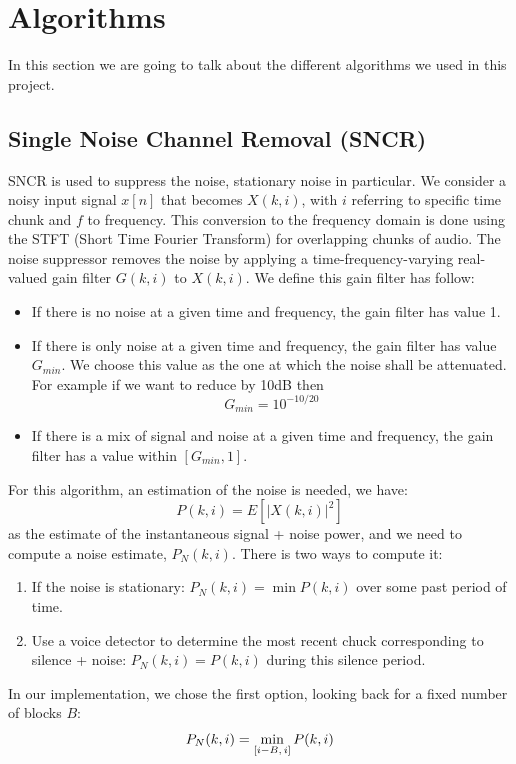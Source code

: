 \documentclass[11pt,a4paper,titlepage]{report}
\providecommand{\tightlist}{%
	\setlength{\itemsep}{0pt}\setlength{\parskip}{0pt}}
\begin{document}
\section{Algorithms}
\hspace*{0.6cm}
In this section we are going to talk about the different algorithms we used in this project.
\subsection{Single Noise Channel Removal (SNCR)}
\label{sec:SNCR}
\hspace*{0.6cm}
SNCR is used to suppress the noise, stationary noise in particular\cite{SNCR}. We consider a noisy input signal $ x[n] $ that becomes $ X(k,i) $, with $ i $ referring to specific time chunk and $ f $ to frequency. This conversion to the frequency domain is done using the STFT (Short Time Fourier Transform) for overlapping chunks of audio. The noise suppressor removes the noise by applying a time-frequency-varying real-valued gain filter $ G(k,i) $ to $ X(k,i) $. We define this gain filter has follow:
\begin{itemize}
	\tightlist
	\item If there is no noise at a given time and frequency, the gain filter has value 1.
	\item If there is only noise at a given time and frequency, the gain filter has value $ G_{min} $. We choose this value as the one at which the noise shall be attenuated. For example if we want to reduce by 10dB then \begin{equation} G_{min} = 10^{-10/20}
	\end{equation}
	\item If there is a mix of signal and noise at a given time and frequency, the gain filter has a value within $ [G_{min}, 1] $.
\end{itemize}
For this algorithm, an estimation of the noise is needed, we have:
 \[P(k,i) = E[|X(k,i)|^2]  \]
as the estimate of the instantaneous signal + noise power, and we need to compute a noise estimate, $ P_{N}(k,i) $. There is two ways to compute it:
\begin{enumerate}
	\tightlist
	\item If the noise is stationary: $ P_{N}(k,i) = \min P(k,i) $ over some past period of time.
	\item Use a voice detector to determine the most recent chuck corresponding to silence + noise: $ P_{N}(k,i) = P(k,i) $ during this silence period.
\end{enumerate}
In our implementation, we chose the first option, looking back for a fixed number of blocks $ B $:
\begin{equation}
P_{N}(k,i) = \min_{[i- B, \hspace{0.05cm}i]} P(k,i)
\end{equation} 
\end{document}
